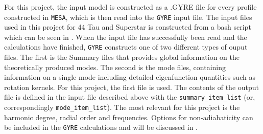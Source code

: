 For this project, the input model is constructed as a .GYRE file for every profile constructed in \texttt{MESA}, which is then read into the \texttt{GYRE} input file. The input files used in this project for 44 Tau and Superstar is constructed from a bash script which can be seen in . When the input file has successfully been read and the calculations have finished, \texttt{GYRE} constructs one of two different types of ouput files. The first is the Summary files that provides global information on the theoretically produced modes. The second is the mode files, containing information on a single mode including detailed eigenfunction quantities such as rotation kernels. For this project, the first file is used. The contents of the output file is defined in the input file described above with the \texttt{summary\_item\_list} (or, correspondingly \texttt{mode\_item\_list}). The most relevant for this project is the harmonic degree, radial order and frequencies. Options for non-adiabaticity can be included in the \texttt{GYRE} calculations and will be discussed in .

